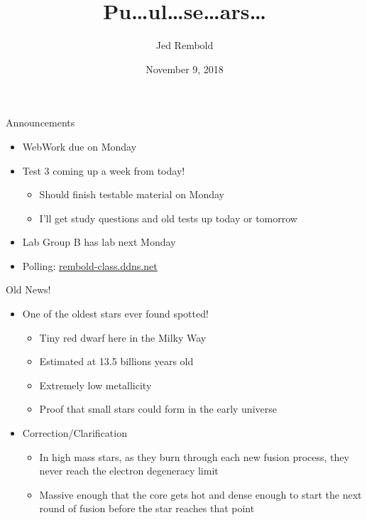 \documentclass[pdf,aspectratio=169]{beamer}
\title{Pu\ldots ul\ldots se\ldots ars\ldots}
\date{November 9, 2018}
\author{Jed Rembold}
\begin{document}
\renewcommand*{\theenumi}{\Alph{enumi}}

\begin{frame}{Announcements}
  \begin{itemize}
	\item WebWork due on Monday
	\item Test 3 coming up a week from today!
	  \begin{itemize}
		  \item Should finish testable material on Monday
		\item I'll get study questions and old tests up today or tomorrow
	  \end{itemize}
  \item Lab Group B has lab next Monday
	\item Polling: \url{rembold-class.ddns.net}
  \end{itemize}
\end{frame}

\begin{frame}{Old News!}
	\begin{itemize}
		\item One of the oldest stars ever found spotted!
			\begin{itemize}
				\item Tiny red dwarf here in the Milky Way
				\item Estimated at 13.5 billions years old
				\item Extremely low metallicity
				\item Proof that small stars could form in the early universe
			\end{itemize}
		\item Correction/Clarification
			\begin{itemize}
				\item In high mass stars, as they burn through each new fusion process, they never reach the electron degeneracy limit
				\item Massive enough that the core gets hot and dense enough to start the next round of fusion before the star reaches that point
			\end{itemize}
	\end{itemize}
\end{frame}

\end{document}

